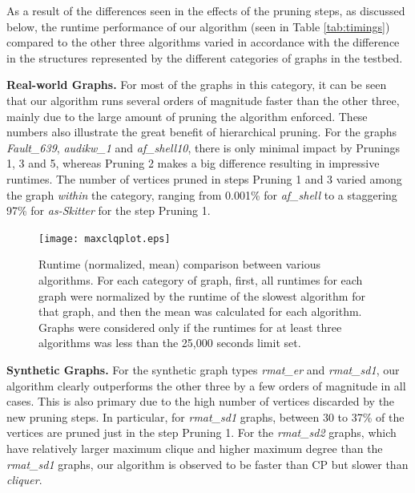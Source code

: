 As a result  of the differences seen in the effects of the pruning steps, as discussed below,
the runtime performance of our algorithm (seen in Table \ref{tab:timings}) compared
to the other three algorithms varied in accordance with the difference in the structures represented 
by the different categories of graphs in the testbed.

{\bf Real-world Graphs. }
For most of the graphs in this category, it can be seen that our algorithm runs several orders of magnitude faster than the other three, mainly due to the large amount of pruning the algorithm enforced. These numbers also illustrate the great benefit of hierarchical pruning. 
For the graphs {\em Fault\_639}, {\em audikw\_1} and {\em af\_shell10}, 
there is only minimal impact by Prunings 1, 3 and 5,
whereas Pruning 2 makes a big difference resulting in impressive runtimes. 
The number of vertices pruned in steps Pruning 1 and 3 varied among the 
graph {\em within} the
category, ranging from 0.001\% for {\it af\_shell} to a staggering 97\% for {\it as-Skitter} 
for the step Pruning 1. 

\begin{figure}
  \centering
    \texttt{[image: maxclqplot.eps]}
  \caption{Runtime (normalized, mean) comparison between various algorithms. For each category of graph, first, all runtimes for each graph were normalized by the runtime of the slowest algorithm for that graph, and then the mean was calculated for each algorithm. Graphs were considered only if the runtimes for at least three algorithms was less than the 25,000 seconds limit set.}
\label{fig-timeplot}
\end{figure}



{\bf Synthetic Graphs. }
For the synthetic graph types {\it rmat\_er} and {\it rmat\_sd1}, our algorithm clearly outperforms 
the other three by a few orders of magnitude in all cases. 
This is also primary due to the high number of vertices discarded by the new pruning steps. 
In particular, for {\it rmat\_sd1} graphs, between 30 to 37\% of the vertices are pruned just in the step Pruning 1. 
For the {\it rmat\_sd2} graphs, which have relatively larger maximum clique and higher maximum degree than the {\it rmat\_sd1} graphs, our algorithm is observed to be faster than 
CP but slower than {\em cliquer}. 

